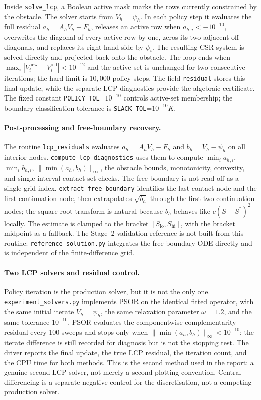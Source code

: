 \documentclass[11pt,a4paper]{article}
\theoremstyle{definition}
\theoremstyle{remark}
\begin{document}
Inside \texttt{solve\_lcp}, a Boolean active mask marks the rows currently
constrained by the obstacle. The solver starts from $V_h=\psi_h$. In each
policy step it evaluates the full residual $a_h=A_hV_h-F_h$, releases an
active row when $a_{h,i}< -10^{-10}$, overwrites the diagonal of every active
row by one, zeros its two adjacent off-diagonals, and replaces its
right-hand side by $\psi_i$. The resulting CSR system is solved directly and
projected back onto the obstacle. The loop ends when
$\max_i|V_i^{\text{new}}-V_i^{\text{old}}|<10^{-12}$ and the active set is
unchanged for two consecutive iterations; the hard limit is $10{,}000$
policy steps. The field \texttt{residual} stores this final update, while the
separate LCP diagnostics provide the algebraic certificate. The fixed
constant \texttt{POLICY\_TOL}=$10^{-10}$ controls active-set membership;
the boundary-classification tolerance is
\texttt{SLACK\_TOL}=$10^{-10}K$.

\paragraph{Post-processing and free-boundary recovery.}
The routine \texttt{lcp\_residuals} evaluates
$a_h=A_hV_h-F_h$ and $b_h=V_h-\psi_h$ on all interior nodes.
\texttt{compute\_lcp\_diagnostics} uses them to compute
$\min_i a_{h,i}$, $\min_i b_{h,i}$,
$\|\min(a_h,b_h)\|_\infty$, the obstacle bounds, monotonicity,
convexity, and single-interval contact-set checks. The free boundary is not
read off as a single grid index. \texttt{extract\_free\_boundary} identifies
the last contact node and the first continuation node, then extrapolates
$\sqrt{b_h}$ through the first two continuation nodes; the square-root
transform is natural because $b_h$ behaves like $c(S-S^*)^2$ locally. The
estimate is clamped to the bracket $[S_{\mathrm{lo}},S_{\mathrm{hi}}]$, with
the bracket midpoint as a fallback. The Stage~2 validation reference is not
built from this routine: \texttt{reference\_solution.py} integrates the
free-boundary ODE directly and is independent of the finite-difference grid.

\paragraph{Two LCP solvers and residual control.}
Policy iteration is the production solver, but it is not the only one.
\texttt{experiment\_solvers.py} implements PSOR on the identical fitted
operator, with the same initial iterate $V_h=\psi_h$, the same relaxation
parameter $\omega=1.2$, and the same tolerance $10^{-10}$. PSOR evaluates
the componentwise complementarity residual every 100 sweeps and stops only
when $\|\min(a_h,b_h)\|_\infty<10^{-10}$; the iterate difference is still
recorded for diagnosis but is not the stopping test. The driver reports the
final update, the true LCP residual, the iteration count, and the CPU time
for both methods. This is the second method used in the report: a genuine
second LCP solver, not merely a second plotting convention. Central
differencing is a separate negative control for the discretisation, not a
competing production solver.
\end{document}
